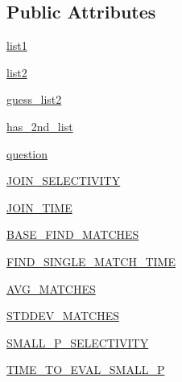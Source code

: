 \subsection*{Public Attributes}
\begin{DoxyCompactItemize}
\item 
\mbox{\hyperlink{classdynamicfilterapp_1_1models_1_1_join_a6a3026f5b982e8d120fcdf1263775a9f}{list1}}
\item 
\mbox{\hyperlink{classdynamicfilterapp_1_1models_1_1_join_a50a79ea070b020da6dab2bce1e31da3f}{list2}}
\item 
\mbox{\hyperlink{classdynamicfilterapp_1_1models_1_1_join_ad05a435e0123cee2d630f3a6f253deba}{guess\+\_\+list2}}
\item 
\mbox{\hyperlink{classdynamicfilterapp_1_1models_1_1_join_abee8b19cb56f38f5834e09e82ec9757b}{has\+\_\+2nd\+\_\+list}}
\item 
\mbox{\hyperlink{classdynamicfilterapp_1_1models_1_1_join_a1a1b6bd27a93f9139a2f44d01f7b3ad1}{question}}
\item 
\mbox{\hyperlink{classdynamicfilterapp_1_1models_1_1_join_a4eec4870d690cac806ee9a954e8d793c}{J\+O\+I\+N\+\_\+\+S\+E\+L\+E\+C\+T\+I\+V\+I\+TY}}
\item 
\mbox{\hyperlink{classdynamicfilterapp_1_1models_1_1_join_a2c37c419033162e3fc2632987e65647e}{J\+O\+I\+N\+\_\+\+T\+I\+ME}}
\item 
\mbox{\hyperlink{classdynamicfilterapp_1_1models_1_1_join_a149aa51e1bac1266ca1f8e2eed2ca2ab}{B\+A\+S\+E\+\_\+\+F\+I\+N\+D\+\_\+\+M\+A\+T\+C\+H\+ES}}
\item 
\mbox{\hyperlink{classdynamicfilterapp_1_1models_1_1_join_a82c364d7ac06cd8c42ccf394d0c610ef}{F\+I\+N\+D\+\_\+\+S\+I\+N\+G\+L\+E\+\_\+\+M\+A\+T\+C\+H\+\_\+\+T\+I\+ME}}
\item 
\mbox{\hyperlink{classdynamicfilterapp_1_1models_1_1_join_a42fd69e46cbed84fb4eb077014ab26c0}{A\+V\+G\+\_\+\+M\+A\+T\+C\+H\+ES}}
\item 
\mbox{\hyperlink{classdynamicfilterapp_1_1models_1_1_join_a52e0d809d7c34941ca658179c684cc1d}{S\+T\+D\+D\+E\+V\+\_\+\+M\+A\+T\+C\+H\+ES}}
\item 
\mbox{\hyperlink{classdynamicfilterapp_1_1models_1_1_join_a17c32d7a1280b5817ac92be68a5f30cd}{S\+M\+A\+L\+L\+\_\+\+P\+\_\+\+S\+E\+L\+E\+C\+T\+I\+V\+I\+TY}}
\item 
\mbox{\hyperlink{classdynamicfilterapp_1_1models_1_1_join_aa18e8aadd97714397358bc349089d8db}{T\+I\+M\+E\+\_\+\+T\+O\+\_\+\+E\+V\+A\+L\+\_\+\+S\+M\+A\+L\+L\+\_\+P}}
\item 

\end{DoxyCompactItemize}
